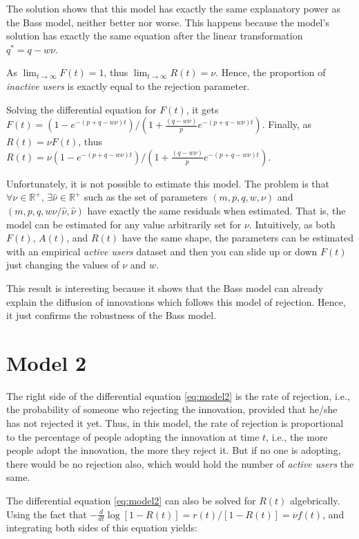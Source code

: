 The solution shows that this model has exactly the same explanatory power as the Bass model, neither better nor worse. This happens because the model's solution has exactly the same equation after the linear transformation $q^* = q - w \nu$.

As $\lim_{t \rightarrow \infty} F(t) = 1$, thus $\lim_{t \rightarrow \infty} R(t) = \nu$. Hence, the proportion of \textit{inactive users} is exactly equal to the rejection parameter.

Solving the differential equation for $F(t)$, it gets $F(t) = (1 - e^{-(p+q-w\nu)t})/(1 + \frac{(q-w\nu)}{p} e^{-(p+q-w\nu)t})$. Finally, as $R(t) = \nu F(t)$, thus $R(t) = \nu (1 - e^{-(p+q-w\nu)t})/(1 + \frac{(q-w\nu)}{p} e^{-(p+q-w\nu)t})$.

Unfortunately, it is not possible to estimate this model. The problem is that $\forall \nu \in \mathbb{R}^+$, $\exists \hat{\nu} \in \mathbb{R}^+$ such as the set of parameters $(m, p, q, w, \nu)$ and $(m, p, q, w\nu/\hat{\nu}, \hat{\nu})$ have exactly the same residuals when estimated. That is, the model can be estimated for any value arbitrarily set for $\nu$. Intuitively, as both $F(t)$, $A(t)$, and $R(t)$ have the same shape, the parameters can be estimated with an empirical \textit{active users} dataset and then you can slide up or down $F(t)$ just changing the values of $\nu$ and $w$.

This result is interesting because it shows that the Bass model can already explain the diffusion of innovations which follows this model of rejection. Hence, it just confirms the robustness of the Bass model.


\section{Model 2}

The right side of the differential equation \ref{eq:model2} is the rate of rejection, i.e., the probability of someone who rejecting the innovation, provided that he/she has not rejected it yet. Thus, in this model, the rate of rejection is proportional to the percentage of people adopting the innovation at time $t$, i.e., the more people adopt the innovation, the more they reject it. But if no one is adopting, there would be no rejection also, which would hold the number of \textit{active users} the same.

The differential equation \ref{eq:model2} can also be solved for $R(t)$ algebrically. Using the fact that $-\frac{d}{dt} \log[1 - R(t)] = r(t) / [1 - R(t)] = \nu f(t)$, and integrating both sides of this equation yields:

